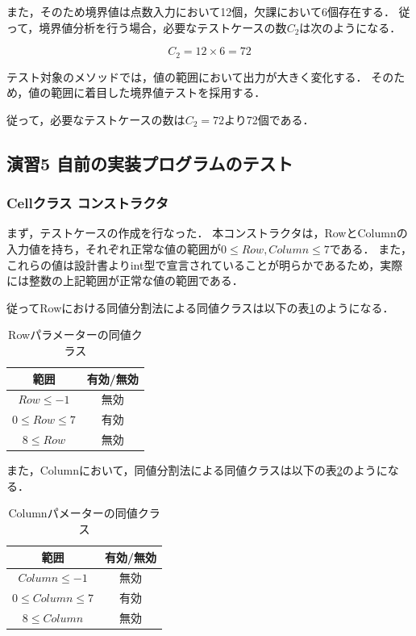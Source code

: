\documentclass[platex,dvipdfmx,12pt]{jsarticle}
\begin{document}
また，そのため境界値は点数入力において12個，欠課において6個存在する．
従って，境界値分析を行う場合，必要なテストケースの数$C_2$は次のようになる．

\begin{equation}
  C_2 = 12 \times 6 = 72
\end{equation}

テスト対象のメソッドでは，値の範囲において出力が大きく変化する．
そのため，値の範囲に着目した境界値テストを採用する．

従って，必要なテストケースの数は$C_2 = 72$より72個である．



\subsection{演習5 自前の実装プログラムのテスト}
\subsubsection{Cellクラス コンストラクタ}
まず，テストケースの作成を行なった．
本コンストラクタは，RowとColumnの入力値を持ち，それぞれ正常な値の範囲が$0 \leq Row, Column \leq 7$である．
また，これらの値は設計書\cite{journal:sekkeisyo}よりint型で宣言されていることが明らかであるため，実際には整数の上記範囲が正常な値の範囲である．

従ってRowにおける同値分割法による同値クラスは以下の表\ref{tab:enshu5-cell-const-1}のようになる．

\begin{table}[H]
  \centering
  \caption{Rowパラメーターの同値クラス}
  \label{tab:enshu5-cell-const-1}
  \begin{tabular}{cc}
    範囲 & 有効/無効 \\
    \hline
    $Row \leq -1$ & 無効 \\
    $0 \leq Row \leq 7$ & 有効 \\
    $8 \leq Row$ & 無効 \\
  \end{tabular}
\end{table}

また，Columnにおいて，同値分割法による同値クラスは以下の表\ref{tab:enshu5-cell-const-2}のようになる．

\begin{table}[H]
  \centering
  \caption{Columnパメーターの同値クラス}
  \label{tab:enshu5-cell-const-2}
  \begin{tabular}{cc}
    範囲 & 有効/無効 \\
    \hline
    $Column \leq -1$ & 無効 \\
    $0 \leq Column \leq 7$ & 有効 \\
    $8 \leq Column$ & 無効 \\
  \end{tabular}
\end{table}
\end{document}
